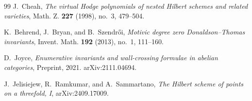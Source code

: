 \documentclass[12pt]{amsart}
\numberwithin{equation}{section}
\theoremstyle{plain}
\theoremstyle{definition}
\theoremstyle{remark}
\begin{document}
\begin{thebibliography}{99}
J.~Cheah,
\emph{The virtual Hodge polynomials of nested Hilbert schemes and related varieties},
Math. Z. \textbf{227} (1998), no.~3, 479--504.

K.~Behrend, J.~Bryan, and B.~Szendr\H{o}i,
\emph{Motivic degree zero Donaldson--Thomas invariants},
Invent. Math. \textbf{192} (2013), no.~1, 111--160.

D.~Joyce,
\emph{Enumerative invariants and wall-crossing formulae in abelian categories},
Preprint, 2021. arXiv:2111.04694.

J.~Jelisiejew, R.~Ramkumar, and A.~Sammartano,
\emph{The Hilbert scheme of points on a threefold, I},
arXiv:2409.17009.

\end{thebibliography}
\end{document}
